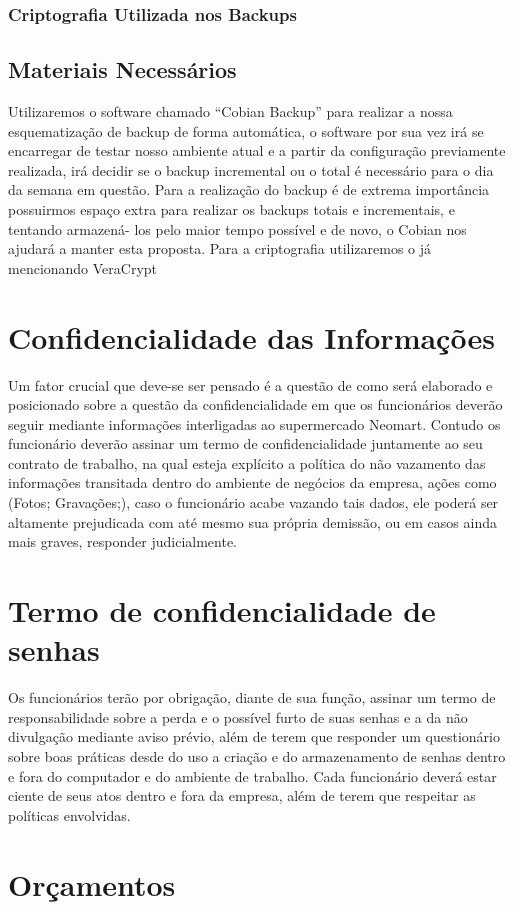 \documentclass[12pt]{article}
\begin{document}
\subsubsection{Criptografia Utilizada nos Backups}
\subsection{Materiais Necessários}
Utilizaremos o software chamado “Cobian Backup” para realizar a nossa esquematização de backup de forma automática, o software por sua vez irá se encarregar de testar nosso ambiente atual e a partir da configuração previamente realizada, irá decidir se o backup incremental ou o total é necessário para o dia da semana em questão. Para a realização do backup é de extrema importância possuirmos espaço extra para realizar os backups totais e incrementais, e tentando armazená- los pelo maior tempo possível e de novo, o Cobian nos ajudará a manter esta proposta. 
Para a criptografia utilizaremos o já mencionando VeraCrypt
\section{Confidencialidade das Informações}
Um fator crucial que deve-se ser pensado é a questão de como será elaborado e posicionado sobre a questão da confidencialidade em que os funcionários deverão seguir mediante informações interligadas ao supermercado Neomart. Contudo os funcionário deverão assinar um termo de confidencialidade juntamente ao seu contrato de trabalho, na qual esteja explícito a política do não vazamento das informações transitada dentro do ambiente de negócios da empresa, ações como (Fotos; Gravações;), caso o funcionário acabe vazando tais dados, ele poderá ser altamente prejudicada com até mesmo sua própria demissão, ou em casos ainda mais graves, responder judicialmente.
\section{Termo de confidencialidade de senhas}
Os funcionários terão por obrigação, diante de sua função, assinar um termo de responsabilidade sobre a perda e o possível furto de suas senhas e a da não divulgação mediante aviso prévio, além de terem que responder um questionário sobre boas práticas desde do uso a criação e do armazenamento de senhas dentro e fora do computador e do ambiente de trabalho. Cada funcionário deverá estar ciente de seus atos dentro e fora da empresa, além de terem que respeitar as políticas envolvidas.
\section{Orçamentos}
\end{document}
